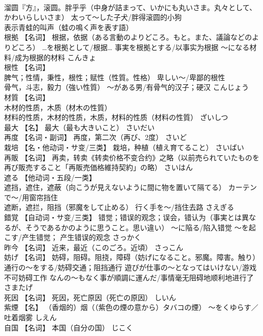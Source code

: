 \documentclass[8pt]{extreport}
\begin{document}
\begin{CJK}{UTF8}{min}
\\	溜圆『方』，滚圆。胖乎乎（中身が詰まって、いかにも丸いさま。丸々として、かわいらしいさま） 太って～した子犬/胖得滚圆的小狗 
\\	表示青蛙的叫声（蛙の鳴く声を表す語）		
\\	根拠	【名词】 根据，依据（ある言動のよりどころ。もと。また、議論などのよりどころ） …を根拠として/根据… 事実を根拠とする/以事实为根据 ～になる材料/成为根据的材料	こんきょ	
\\	根性	【名词】 
\\	脾气；性情，秉性，根性；赋性（性質。性格） 卑しい～/卑鄙的根性 
\\	骨气，斗志，毅力（強い性質） ～がある男/有骨气的汉子；硬汉	こんじょう	
\\	材質	【名词】 
\\	木材的性质，木质（材木の性質） 
\\	材料的性质，木材的性质，木质，材料的性质（材料の性質）	ざいしつ	
\\	最大	【名】 最大（最も大きいこと）	さいだい	
\\	再度	【名词・副词】 再度，第二次（再び、2度）	さいど	
\\	栽培	【名・他动词・サ变/三类】 栽培，种植（植え育てること）	さいばい	
\\	再販	【名词】 再卖，转卖《转卖价格不变合约》之略（以前売られていたものを再び販売すること「再販売価格維持契約」の略）	さいはん	
\\	遮る	【他动词・五段/一类】 
\\	遮挡，遮住，遮蔽（向こうが見えないように間に物を置いて隔てる） カーテンで～/用窗帘挡住 
\\	遮断，遮拦，阻挡（邪魔をして止める） 行く手を～/挡住去路	さえぎる	
\\	錯覚	【自动词・サ变/三类】 错觉；错误的观念；误会，错认为（事実とは異なるが、そうであるかのように思うこと。思い違い） ～に陥る/陷入错觉 ～を起こす/产生错觉； 产生错误的观念	さっかく	
\\	昨今	【名词】 近来，最近（このごろ。近頃）	さっこん	
\\	妨げ	【名词】 妨碍，阻碍。阻挠，障碍（妨げになること。邪魔。障害。触り） 通行の～をする/妨碍交通；阻挡通行 遊びが仕事の～となってはいけない/游戏不可妨碍工作 なんの～もなく事が順調に運んだ/事情毫无阻碍地顺利地进行了	さまたげ	
\\	死因	【名词】 死因，死亡原因（死亡の原因）	しいん	
\\	紫煙	【名】 （香烟的）烟（（紫色の煙の意から）タバコの煙） ～をくゆらす／吐着烟雾	しえん	
\\	自国	【名词】 本国（自分の国）	じこく	

\end{CJK}
\end{document}
